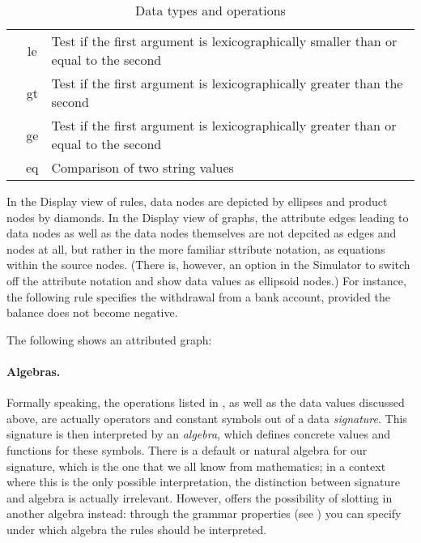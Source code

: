 \begin{table}
\begin{center}
\begin{tabular}{|c|c|l|}
  & \sf le & Test if the first argument is
  lexicographically smaller than or equal to the second \\
  & \sf gt & Test if the first argument is
  lexicographically greater than the second \\
  & \sf ge &Test if the first argument is
  lexicographically greater than or equal to the second \\
  & \sf eq & Comparison of two string values \\
\hline\hline
\end{tabular}
\end{center}
\vspace*{-\medskipamount}
\caption{Data types and operations}
\vspace*{-\medskipamount}
\end{table}

In the Display view of rules, data nodes are depicted by ellipses and product
nodes by diamonds. In the Display view of graphs, the attribute edges leading
to data nodes as well as the data nodes themselves are not depcited as edges
and nodes at all, but rather in the more familiar sttribute notation, as
equations within the source nodes. (There is, however, an option in the
Simulator to switch off the attribute notation and show data values as
ellipsoid nodes.) For instance, the following rule
specifies the withdrawal from a bank account, provided the balance does not
become negative.


The following shows an attributed graph:


\paragraph{Algebras.}

Formally speaking, the operations listed in , as well as the data
values discussed above, are actually operators and constant symbols out of a
data \emph{signature}. This signature is then interpreted by an \emph{algebra},
which defines concrete values and functions for these symbols. There is a
default or natural algebra for our signature, which is the one that we all know
from mathematics; in a context where this is the only possible interpretation,
the distinction between signature and algebra is actually irrelevant. However,
\GROOVE{} offers the possibility of slotting in another algebra instead:
through the grammar properties (see ) you can
specify under which algebra the rules should be interpreted.

